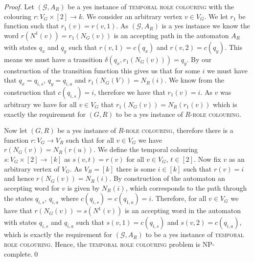 \documentclass[runningheads]{llncs}
\begin{document}
\begin{proof}
Let $(\mathcal{G},A_R)$ be a yes instance of \textsc{temporal role colouring} with the colouring $r:V_G \times[2] \rightarrow k$.
We consider an arbitrary vertex $v \in V_G$. We let $r_1$ be function such that $r_1(v)=r(v,1)$.
As $(\mathcal{G},A_R)$ is a yes instance we know the word $r(N^1(v))=r_1(N_G(v))$ is an accepting path in the automaton $A_R$ with states $q_x$ and $q_y$ such that $r(v,1)=c(q_x)$ and $r(v,2)=c(q_y)$. This means we must have a transition $\delta(q_x,r_1(N_G(v)))=q_y$. By our construction of the transition function this gives us that for some $i$ we must have that $q_x=q_{i,s}$, $q_y=q_{i,a}$ and $r_1(N_G(V))=N_R(i)$. We know from the construction that $c(q_{i,s})=i$, therefore we have that $r_1(v)=i$. As $v$ was arbitrary we have for all $v \in V_G$ that $r_1(N_G(v))=N_R(r_1(v))$ which is exactly the requirement for $(G,R)$ to be a yes instance of \textsc{$R$-role colouring}.

Now let $(G,R)$ be a yes instance of \textsc{$R$-role colouring}, therefore there is a function $r: V_G \rightarrow V_R$ such that for all $v \in V_G$ we have $ r(N_G(v))=N_R(r(u))$. 
We define the temporal colouring $s: V_G \times [2] \rightarrow [k]$ as $s(v,t)=r(v)$ for all $v \in V_G$, $t \in [2]$.
Now fix $v$ as an arbitrary vertex of $V_G$.
As $V_R=[k]$ there is some $i \in [k]$ such that $r(v)=i$ and hence $r(N_G(v))=N_R(i)$. 
By construction of the automaton an accepting word for $v$ is given by $N_R(i)$, which corresponds to the path through the states $q_{i,s}$, $q_{i,a}$ where $c(q_{i,s})=c(q_{1,a})=i$.
 Therefore, for all $v\in V_G$ we have that $r(N_G(v))=s(N^1(v))$ is an accepting word in the automaton with states $q_{i,s}$ and $q_{i,a}$ such that $s(v,1)=c(q_{i,s})$ and $s(v,2)=c(q_{i,a})$, which is exactly the requirement for $(\mathcal{G},A_R)$ to be a yes instance of \textsc{temporal role colouring}.
Hence, the \textsc{temporal role colouring} problem is NP-complete.\qed
\end{proof} 
\end{document}
